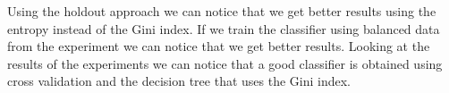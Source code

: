 \documentclass{article}
\begin{document}
\noindent Using the holdout approach we can notice that we get better results using the entropy instead of the Gini index. If we train the classifier using balanced data from the experiment we can notice that we get better results. Looking at the results of the experiments we can notice that a good classifier is obtained using cross validation and the decision tree that uses the Gini index.





\clearpage
{}


\newpage

\appendix


\end{document}
